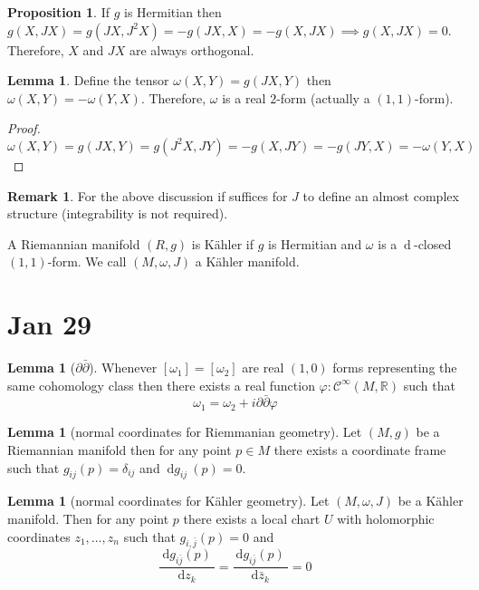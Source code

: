 \documentclass[12pt]{extarticle}
\newcommand{\R}{\mathbb{R}}
\renewcommand{\d}[1]{\: \mathrm{d}#1 \:}
\newcommand{\deriv}[2]{\frac{\d{#1}}{\d{#2}}}
\theoremstyle{definition}
\newtheorem{lemma}[theorem]{Lemma}
\newtheorem{proposition}[theorem]{Proposition}
\newtheorem{remark}{Remark}
\newenvironment{definition}[1][Definition:]{\begin{trivlist}
\item[\hskip \labelsep {\bfseries #1}]}{\end{trivlist}}
\newcommand{\Class}[2]{\mathcal{C}^{#1} \left( #2 \right)}
\begin{document}
\begin{proposition}
If $g$ is Hermitian then $g(X, JX) = g(JX, J^2 X) = - g(JX, X) = - g(X, J X) \implies g(X, JX) = 0$. Therefore, $X$ and $JX$ are always orthogonal. 
\end{proposition}

\begin{lemma}
Define the tensor $\omega(X, Y) = g(JX, Y)$ then $\omega(X, Y) = - \omega(Y, X)$. Therefore, $\omega$ is a real $2$-form (actually a $(1,1)$-form). 
\end{lemma}

\begin{proof}
\[ \omega(X, Y) = g(J X, Y) = g(J^2 X, J Y) = - g(X, J Y) = - g(JY, X) = - \omega(Y, X) \]
\end{proof}

\begin{remark}
For the above discussion if suffices for $J$ to define an almost complex structure (integrability is not required). 
\end{remark}

\begin{definition}
A Riemannian manifold $(R, g)$ is K\"{a}hler if $g$ is Hermitian and $\omega$ is a $\d{}$-closed $(1,1)$-form. We call $(M, \omega, J)$ a K\"{a}hler manifold. 
\end{definition}

\section{Jan 29}

\begin{lemma}[$\partial \bar{\partial}$]
Whenever $[\omega_1] = [\omega_2]$ are real $(1,0)$ forms representing the same cohomology class then there exists a real function $\varphi : \Class{\infty}{M, \R}$ such that \[ \omega_1 = \omega_2 + i \partial \bar{\partial} \varphi \]
\end{lemma}

\begin{lemma}[normal coordinates for Riemmanian geometry]
Let $(M, g)$ be a Riemannian manifold then for any point $p \in M$ there exists a coordinate frame such that $g_{ij}(p) = \delta_{ij}$ and $\d{g_{ij}}(p) = 0$. 
\end{lemma}

\begin{lemma}[normal coordinates for K\"{a}hler geometry]
Let $(M, \omega, J)$ be a K\"{a}hler manifold. Then for any point $p$ there exists a local chart $U$ with holomorphic coordinates $z_1, \dots, z_n$ such that $g_{i, \bar{j}}(p) = 0$ and 
\[ \deriv{g_{i \bar{j}}(p)}{z_k} = \deriv{g_{i\bar{j}}(p)}{\bar{z}_k} = 0 \]
\end{lemma}
\end{document}
